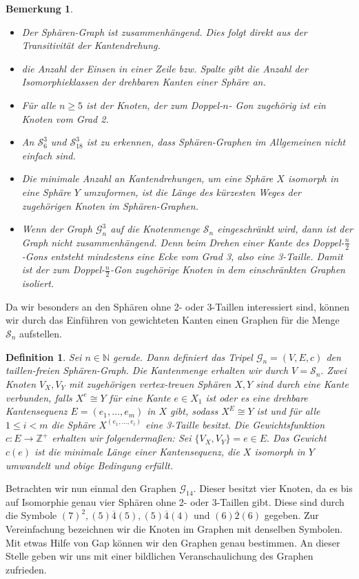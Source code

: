 \documentclass[12pt,titlepage,twoside,cleardoublepage]{article}
\theoremstyle{nummermitklammern}
\newtheorem{definition}[temp]{Definition}
\newtheorem{bemerkung}[temp]{Bemerkung}
\newtheorem{definition}[zahl]{Definition}
\newtheorem{bemerkung}[zahl]{Bemerkung}
\numberwithin{equation}{section}
\begin{document}
 \begin{bemerkung}
 \begin{itemize}
 \item Der Sphären-Graph ist zusammenhängend. Dies folgt direkt aus der Transitivität der Kantendrehung.
 \item die Anzahl der Einsen in einer Zeile bzw. Spalte gibt die Anzahl der Isomorphieklassen der drehbaren Kanten einer Sphäre an.
 \item Für alle $n\geq 5$ ist der Knoten, der zum Doppel-$n$-
 Gon zugehörig ist ein Knoten vom Grad 2.
 \item An $\mathcal{S}^3_6$ und $\mathcal{S}_{18}^3$ ist zu erkennen, dass Sphären-Graphen im Allgemeinen nicht einfach sind. 
 \item Die minimale Anzahl an Kantendrehungen, um eine Sphäre $X$ isomorph in eine Sphäre $Y$ umzuformen, ist die Länge des kürzesten Weges der zugehörigen Knoten im Sphären-Graphen.   
 \item Wenn der Graph $\mathcal{G}^3_n$ auf die Knotenmenge $\mathcal{S}_n$ eingeschränkt wird, dann ist der Graph nicht zusammenhängend. Denn beim Drehen einer Kante des Doppel-$\frac{n}{2}$-Gons entsteht mindestens eine Ecke vom Grad 3, also eine 3-Taille. Damit ist der zum Doppel-$\frac{n}{2}$-Gon zugehörige Knoten in dem einschränkten Graphen isoliert.
 \end{itemize}
 \end{bemerkung}
 Da wir besonders an den Sphären ohne 2- oder 3-Taillen interessiert sind, können wir durch das Einführen von gewichteten Kanten einen Graphen für die Menge $\mathcal{S}_n$ aufstellen.
 \begin{definition}
Sei $n\in \mathbb{N}$ gerade. Dann definiert das Tripel $\mathcal{G}_n=(V,E,c)$ den \emph{taillen-freien Sphären-Graph}. Die Kantenmenge erhalten wir durch $V=\mathcal{S}_n.$ Zwei Knoten $V_X,V_Y$ mit zugehörigen vertex-treuen Sphären $X,Y$ sind durch eine Kante verbunden, falls $X^e\cong Y$ für eine Kante $e\in X_1$ ist oder es eine drehbare Kantensequenz $E=(e_1,\ldots,e_m)$ in $X$ gibt, sodass $X^E\cong Y$ ist und für alle $1\leq i < m $ die Sphäre $X^{(e_1,\ldots,e_i)}$ eine 3-Taille besitzt. Die Gewichtsfunktion $c:E\to\mathbb{Z}^+$  erhalten wir folgendermaßen: Sei $\{V_X,V_Y\}=e\in E.$ Das Gewicht $c(e)$ ist die minimale Länge einer Kantensequenz, die $X$ isomorph in $Y$ umwandelt und obige Bedingung erfüllt.
 \end{definition}
 Betrachten wir nun einmal den Graphen $\mathcal{G}_{14}.$
Dieser besitzt vier Knoten, da es bis auf Isomorphie genau vier Sphären ohne 2- oder 3-Taillen gibt. Diese sind durch die Symbole $(7)^2,(5)\overline{4}(5),(5)\overline{4}(4)$ und $(6)\overline{2}(6)$ gegeben. Zur Vereinfachung bezeichnen wir die Knoten im Graphen mit denselben Symbolen. Mit etwas Hilfe von Gap können wir den Graphen genau bestimmen. An dieser Stelle geben wir uns mit einer bildlichen Veranschaulichung des Graphen zufrieden.
\end{document}
